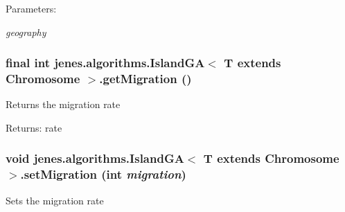 \begin{Desc}
\item[Parameters:]
\begin{description}
\item[{\em geography}]\end{description}
\end{Desc}
\hypertarget{classjenes_1_1algorithms_1_1_island_g_a_3_01_t_01extends_01_chromosome_01_4_74419cc71fe52538d241f7362b63709a}{
\subsubsection[getMigration]{\setlength{\rightskip}{0pt plus 5cm}final int jenes.algorithms.IslandGA$<$ T extends Chromosome $>$.getMigration ()}}
\label{classjenes_1_1algorithms_1_1_island_g_a_3_01_t_01extends_01_chromosome_01_4_74419cc71fe52538d241f7362b63709a}


Returns the migration rate \begin{Desc}
\item[Returns:]rate \end{Desc}
\hypertarget{classjenes_1_1algorithms_1_1_island_g_a_3_01_t_01extends_01_chromosome_01_4_309c1fe9c74c728b2ecab37e91f09322}{
\subsubsection[setMigration]{\setlength{\rightskip}{0pt plus 5cm}void jenes.algorithms.IslandGA$<$ T extends Chromosome $>$.setMigration (int {\em migration})}}
\label{classjenes_1_1algorithms_1_1_island_g_a_3_01_t_01extends_01_chromosome_01_4_309c1fe9c74c728b2ecab37e91f09322}


Sets the migration rate

